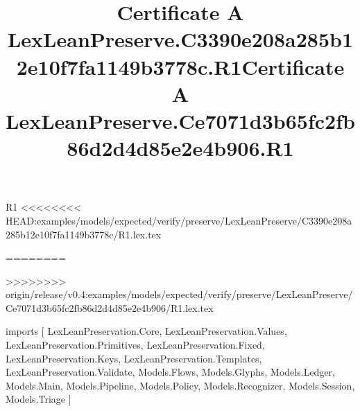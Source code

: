 \begin{lexlean}{R1}
<<<<<<<< HEAD:examples/models/expected/verify/preserve/LexLeanPreserve/C3390e208a285b12e10f7fa1149b3778c/R1.lex.tex
\title{Certificate A LexLeanPreserve.C3390e208a285b12e10f7fa1149b3778c.R1}
========
\title{Certificate A LexLeanPreserve.Ce7071d3b65fc2fb86d2d4d85e2e4b906.R1}
>>>>>>>> origin/release/v0.4:examples/models/expected/verify/preserve/LexLeanPreserve/Ce7071d3b65fc2fb86d2d4d85e2e4b906/R1.lex.tex
\begin{coremodule}
imports [
  LexLeanPreservation.Core,
  LexLeanPreservation.Values,
  LexLeanPreservation.Primitives,
  LexLeanPreservation.Fixed,
  LexLeanPreservation.Keys,
  LexLeanPreservation.Templates,
  LexLeanPreservation.Validate,
  Models.Flows,
  Models.Glyphs,
  Models.Ledger,
  Models.Main,
  Models.Pipeline,
  Models.Policy,
  Models.Recognizer,
  Models.Session,
  Models.Triage
]


\end{coremodule}
\end{lexlean}
